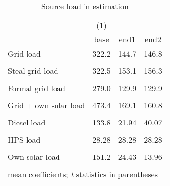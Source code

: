 \begin{table}[htbp]\centering
\caption{Source load in estimation}
\begin{tabular}{l*{3}{c}}
\toprule
                &\multicolumn{1}{c}{(1)}&         &         \\
                &     base&     end1&     end2\\
\midrule
Grid load       &    322.2&    144.7&    146.8\\
                &         &         &         \\
\addlinespace
Steal grid load &    322.5&    153.1&    156.3\\
                &         &         &         \\
\addlinespace
Formal grid load&    279.0&    129.9&    129.9\\
                &         &         &         \\
\addlinespace
Grid + own solar load&    473.4&    169.1&    160.8\\
                &         &         &         \\
\addlinespace
Diesel load     &    133.8&    21.94&    40.07\\
                &         &         &         \\
\addlinespace
HPS load        &    28.28&    28.28&    28.28\\
                &         &         &         \\
\addlinespace
Own solar load  &    151.2&    24.43&    13.96\\
                &         &         &         \\
\bottomrule
\multicolumn{4}{l}{\footnotesize mean coefficients; \textit{t} statistics in parentheses}\\
\end{tabular}
\end{table}
